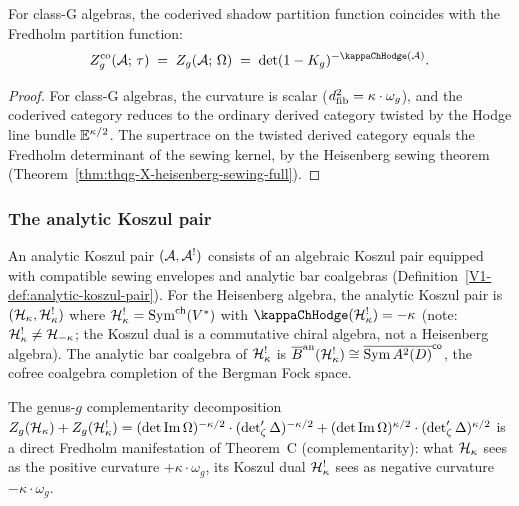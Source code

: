 \begin{proposition}[Coderived = Fredholm for class~G;
\ClaimStatusProvedHere]%
%
For class-G algebras, the coderived shadow partition function
coincides with the Fredholm partition function:
\begin{equation}%
Z_g^{\mathrm{co}}(\cA;\,\tau)
\;=\;
Z_g(\cA;\,\Omega)
\;=\;
\det(1 - \sewker_g)^{-\kappaChHodge(\cA)}.
\end{equation}
\end{proposition}

\begin{proof}
For class-G algebras, the curvature is scalar
($d_{\mathrm{fib}}^2 = \kappa \cdot \omega_g$), and the coderived category
reduces to the ordinary derived category twisted by the Hodge
line bundle $\mathbb{E}^{\kappa/2}$. The supertrace on
the twisted derived category equals the Fredholm determinant
of the sewing kernel, by the Heisenberg sewing theorem
(Theorem~\ref{thm:thqg-X-heisenberg-sewing-full}).
\end{proof}

\subsubsection{The analytic Koszul pair}

\begin{remark}%
%
An analytic Koszul pair $(\mathcal{A}, \mathcal{A}^!)$ consists of an
algebraic Koszul pair equipped with compatible sewing
envelopes and analytic bar coalgebras
(Definition~\ref{V1-def:analytic-koszul-pair}). For the
Heisenberg algebra, the analytic Koszul pair is
$(\mathcal{H}_\kappa, \mathcal{H}_\kappa^!)$ where
$\mathcal{H}_\kappa^! = \operatorname{Sym}^{\mathrm{ch}}(V^*)$ with
$\kappaChHodge(\cH_\kappa^!) = -\kappa$
(note: $\mathcal{H}_\kappa^! \neq \mathcal{H}_{-\kappa}$; the Koszul dual
is a commutative chiral algebra, not a Heisenberg algebra).
The analytic bar coalgebra of $\mathcal{H}_\kappa^!$
is $\overline{B}^{\mathrm{an}}(\mathcal{H}_\kappa^!) \cong
\overline{\operatorname{Sym} A^2(D)}^{\mathsf{co}}$, the
cofree coalgebra completion of the Bergman Fock space.

The genus-$g$ complementarity decomposition
$Z_g(\mathcal{H}_\kappa) + Z_g(\mathcal{H}_\kappa^!)
= (\det\operatorname{Im}\Omega)^{-\kappa/2}
\cdot (\det\nolimits'_\zeta\Delta)^{-\kappa/2}
+ (\det\operatorname{Im}\Omega)^{\kappa/2}
\cdot (\det\nolimits'_\zeta\Delta)^{\kappa/2}$
is a direct Fredholm manifestation of Theorem~C
(complementarity): what $\mathcal{H}_\kappa$ sees as the positive
curvature $+\kappa \cdot \omega_g$, its Koszul dual $\mathcal{H}_\kappa^!$
sees as negative curvature $-\kappa \cdot \omega_g$.
\end{remark}

